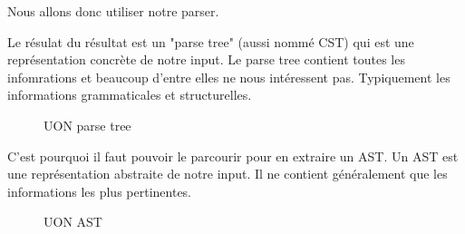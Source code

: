 \documentclass[
    iict, %
    il, %
]{heig-tb}
\begin{document}
Nous allons donc utiliser notre parser.

Le résulat du résultat est un "parse tree" (aussi nommé CST) qui est une représentation concrète de notre input. Le parse tree contient toutes les infomrations et beaucoup d'entre elles ne nous intéressent pas.
Typiquement les informations grammaticales et structurelles.
\begin{figure}[!h]
    \begin{center}
    \end{center}
    \caption[UON parse tree]{\label{parse-tree} UON parse tree}
\end{figure}

C'est pourquoi il faut pouvoir le parcourir pour en extraire un AST.
Un AST est une représentation abstraite de notre input. Il ne contient généralement que les informations les plus pertinentes.

\begin{figure}[!h]
    \begin{center}
    \end{center}
    \caption[UON AST]{\label{ast} UON AST}
\end{figure}
\end{document}
